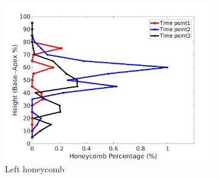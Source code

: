 \begin{figure}[H]
\begin{subfigure}{.42\linewidth}
  \includegraphics[width=\linewidth,trim={{.0\wd0} {.0\wd0} {.0\wd0} {.0\wd0}},clip]{QuantitativeAnalysis/Image/IPF21LeftLungHoneycombDiseaseAgainstHeight.jpg} %
  \caption{Left honeycomb}
  \label{fig:IPF21DiseaseAgainstHeightMain-e} 
\end{subfigure} 
\begin{subfigure}{.42\linewidth}%

\end{subfigure}
\end{figure}
